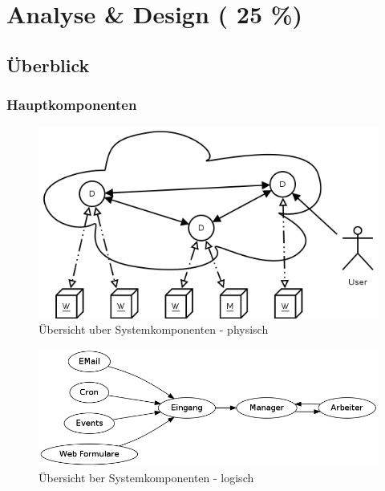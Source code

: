 \chapter{Analyse \& Design ( 25 \%)}






\section{\"Uberblick}
\subsection{Hauptkomponenten}


\begin{figure}[ht] 
  \label{fig:grob-layout-komponenten}
  \begin{center}
      \includegraphics[width=\textwidth]{imageinput/grob-layout-komponenten.png}
  \end{center}
  \caption{\"Ubersicht uber Systemkomponenten - physisch}
\end{figure}


\begin{figure}[ht]
  \label{fig:grob-layout-komponenten-logisch}
  \begin{center}
      \includegraphics[width=\textwidth]{imageinput/grob-layout-komponenten-logisch.png}
  \end{center}
  \caption{\"Ubersicht ber Systemkomponenten - logisch}
\end{figure}


